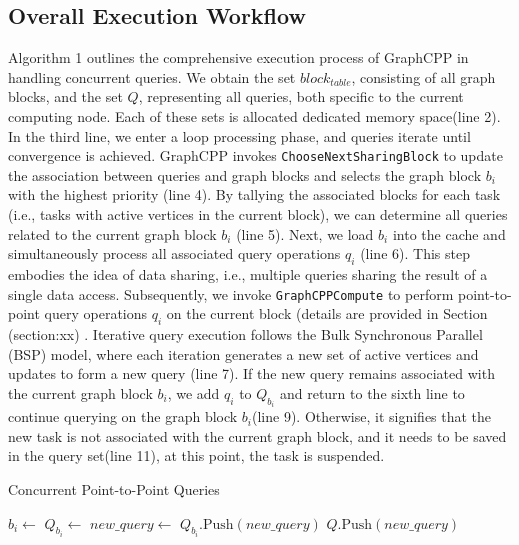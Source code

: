 \documentclass[lettersize,journal]{IEEEtran} %
\begin{document}
\subsection{Overall Execution Workflow}
Algorithm 1 outlines the comprehensive execution process of GraphCPP in handling concurrent queries. We obtain the set \(block_{table}\), consisting of all graph blocks, and the set \(Q\), representing all queries, both specific to the current computing node. Each of these sets is allocated dedicated memory space(line 2). In the third line, we enter a loop processing phase, and queries iterate until convergence is achieved. GraphCPP invokes \texttt{ChooseNextSharingBlock} to update the association between queries and graph blocks and selects the graph block \(b_i\) with the highest priority (line 4). By tallying the associated blocks for each task (i.e., tasks with active vertices in the current block), we can determine all queries related to the current graph block \(b_i\) (line 5). Next, we load \(b_i\) into the cache and simultaneously process all associated query operations \(q_i\) (line 6). This step embodies the idea of data sharing, i.e., multiple queries sharing the result of a single data access. Subsequently, we invoke \texttt{GraphCPPCompute} to perform point-to-point query operations \(q_i\) on the current block (details are provided in Section (section:xx) . Iterative query execution follows the Bulk Synchronous Parallel (BSP) model, where each iteration generates a new set of active vertices and updates to form a new query (line 7). If the new query remains associated with the current graph block \(b_i\), we add \(q_i\) to \(Q_{b_i}\) and return to the sixth line to continue querying on the graph block \(b_i\)(line 9). Otherwise, it signifies that the new task is not associated with the current graph block, and it needs to be saved in the query set(line 11), at this point, the task is suspended.

\begin{algorithm}
\caption{Concurrent Point-to-Point Queries}
\label{alg:concurrent_queries}
\begin{algorithmic}[1]

    \State {}
        \State $b_i \gets$ 
        \State $Q_{b_i} \gets$ 
            \State $new\_query \gets$ 
                \State $Q_{b_i}.\text{Push}(new\_query)$
            \Else
                \State $Q.\text{Push}(new\_query)$
            \EndIf
        \EndFor
    \EndWhile
\EndFunction

\end{algorithmic}
\end{algorithm}
  
\end{document}
